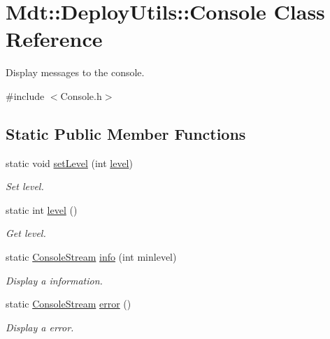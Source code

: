 \hypertarget{class_mdt_1_1_deploy_utils_1_1_console}{}\section{Mdt\+:\+:Deploy\+Utils\+:\+:Console Class Reference}
\label{class_mdt_1_1_deploy_utils_1_1_console}


Display messages to the console.  




{\ttfamily \#include $<$Console.\+h$>$}

\subsection*{Static Public Member Functions}
\begin{DoxyCompactItemize}
\item 
static void \hyperlink{class_mdt_1_1_deploy_utils_1_1_console_a389364a6d53b7361d321bd3aa9408f19}{set\+Level} (int \hyperlink{class_mdt_1_1_deploy_utils_1_1_console_a134e2d7e4a59b3634f007ae09301c684}{level})
\begin{DoxyCompactList}\small\item\em Set level. \end{DoxyCompactList}\item 
static int \hyperlink{class_mdt_1_1_deploy_utils_1_1_console_a134e2d7e4a59b3634f007ae09301c684}{level} ()\hypertarget{class_mdt_1_1_deploy_utils_1_1_console_a134e2d7e4a59b3634f007ae09301c684}{}\label{class_mdt_1_1_deploy_utils_1_1_console_a134e2d7e4a59b3634f007ae09301c684}

\begin{DoxyCompactList}\small\item\em Get level. \end{DoxyCompactList}\item 
static \hyperlink{class_mdt_1_1_deploy_utils_1_1_console_stream}{Console\+Stream} \hyperlink{class_mdt_1_1_deploy_utils_1_1_console_a3ddc9a6338a0fd7d01ca7a60936415b5}{info} (int minlevel)
\begin{DoxyCompactList}\small\item\em Display a information. \end{DoxyCompactList}\item 
static \hyperlink{class_mdt_1_1_deploy_utils_1_1_console_stream}{Console\+Stream} \hyperlink{class_mdt_1_1_deploy_utils_1_1_console_a9398a0a4aebbe2184847b1ed75a40def}{error} ()\hypertarget{class_mdt_1_1_deploy_utils_1_1_console_a9398a0a4aebbe2184847b1ed75a40def}{}\label{class_mdt_1_1_deploy_utils_1_1_console_a9398a0a4aebbe2184847b1ed75a40def}

\begin{DoxyCompactList}\small\item\em Display a error. \end{DoxyCompactList}\end{DoxyCompactItemize}


